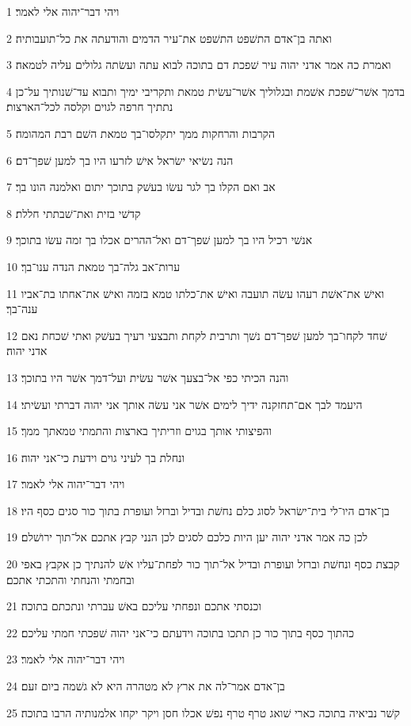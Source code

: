 \par 1 ויהי דבר־יהוה אלי לאמר׃
\par 2 ואתה בן־אדם התשׁפט התשׁפט את־עיר הדמים והודעתה את כל־תועבותיה׃
\par 3 ואמרת כה אמר אדני יהוה עיר שׁפכת דם בתוכה לבוא עתה ועשׂתה גלולים עליה לטמאה׃
\par 4 בדמך אשׁר־שׁפכת אשׁמת ובגלוליך אשׁר־עשׂית טמאת ותקריבי ימיך ותבוא עד־שׁנותיך על־כן נתתיך חרפה לגוים וקלסה לכל־הארצות׃
\par 5 הקרבות והרחקות ממך יתקלסו־בך טמאת השׁם רבת המהומה׃
\par 6 הנה נשׂיאי ישׂראל אישׁ לזרעו היו בך למען שׁפך־דם׃
\par 7 אב ואם הקלו בך לגר עשׂו בעשׁק בתוכך יתום ואלמנה הונו בך׃
\par 8 קדשׁי בזית ואת־שׁבתתי חללת׃
\par 9 אנשׁי רכיל היו בך למען שׁפך־דם ואל־ההרים אכלו בך זמה עשׂו בתוכך׃
\par 10 ערות־אב גלה־בך טמאת הנדה ענו־בך׃
\par 11 ואישׁ את־אשׁת רעהו עשׂה תועבה ואישׁ את־כלתו טמא בזמה ואישׁ את־אחתו בת־אביו ענה־בך׃
\par 12 שׁחד לקחו־בך למען שׁפך־דם נשׁך ותרבית לקחת ותבצעי רעיך בעשׁק ואתי שׁכחת נאם אדני יהוה׃
\par 13 והנה הכיתי כפי אל־בצעך אשׁר עשׂית ועל־דמך אשׁר היו בתוכך׃
\par 14 היעמד לבך אם־תחזקנה ידיך לימים אשׁר אני עשׂה אותך אני יהוה דברתי ועשׂיתי׃
\par 15 והפיצותי אותך בגוים וזריתיך בארצות והתמתי טמאתך ממך׃
\par 16 ונחלת בך לעיני גוים וידעת כי־אני יהוה׃
\par 17 ויהי דבר־יהוה אלי לאמר׃
\par 18 בן־אדם היו־לי בית־ישׂראל לסוג כלם נחשׁת ובדיל וברזל ועופרת בתוך כור סגים כסף היו׃
\par 19 לכן כה אמר אדני יהוה יען היות כלכם לסגים לכן הנני קבץ אתכם אל־תוך ירושׁלם׃
\par 20 קבצת כסף ונחשׁת וברזל ועופרת ובדיל אל־תוך כור לפחת־עליו אשׁ להנתיך כן אקבץ באפי ובחמתי והנחתי והתכתי אתכם׃
\par 21 וכנסתי אתכם ונפחתי עליכם באשׁ עברתי ונתכתם בתוכה׃
\par 22 כהתוך כסף בתוך כור כן תתכו בתוכה וידעתם כי־אני יהוה שׁפכתי חמתי עליכם׃
\par 23 ויהי דבר־יהוה אלי לאמר׃
\par 24 בן־אדם אמר־לה את ארץ לא מטהרה היא לא גשׁמה ביום זעם׃
\par 25 קשׁר נביאיה בתוכה כארי שׁואג טרף טרף נפשׁ אכלו חסן ויקר יקחו אלמנותיה הרבו בתוכה׃
